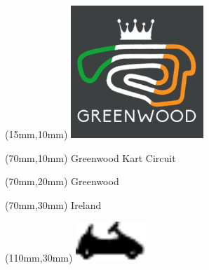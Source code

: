 \null\newpage
\begin{textblock*}{50mm}(15mm,10mm)%
\includegraphics[width=50mm]{LG/GRWO.png}
\end{textblock*}
\begin{textblock*}{130mm}(70mm,10mm)%
{\fontsize{20}{20}\selectfont Greenwood Kart Circuit}\\
\end{textblock*}
\begin{textblock*}{120mm}(70mm,20mm)%
{\fontsize{16}{16}\selectfont Greenwood}\\
\end{textblock*}
\begin{textblock*}{120mm}(70mm,30mm)%
{\fontsize{12}{12}\selectfont Ireland}
\end{textblock*}
\begin{textblock*}{30mm}(110mm,30mm)%
\centering
\includegraphics[height=15mm]{icons/kart.pdf}
\end{textblock*}
